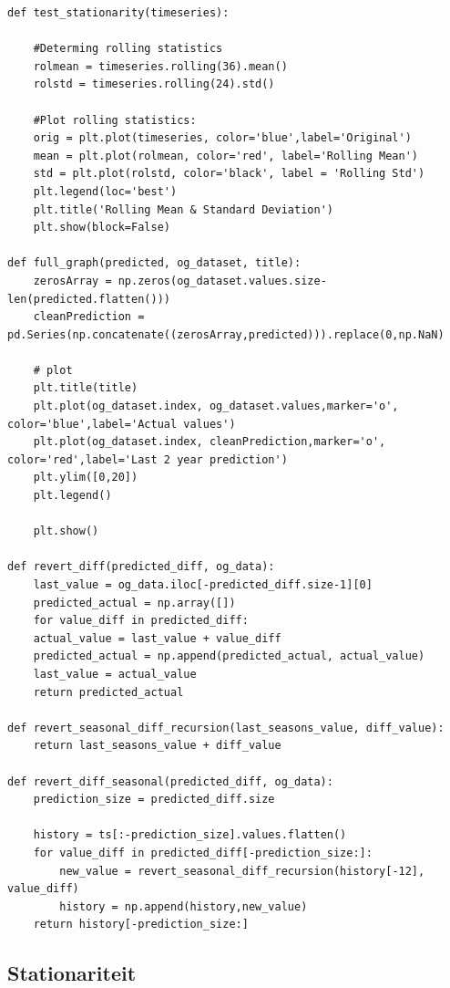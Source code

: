 \begin{verbatim}
def test_stationarity(timeseries):

    #Determing rolling statistics
    rolmean = timeseries.rolling(36).mean()
    rolstd = timeseries.rolling(24).std()
    
    #Plot rolling statistics:
    orig = plt.plot(timeseries, color='blue',label='Original')
    mean = plt.plot(rolmean, color='red', label='Rolling Mean')
    std = plt.plot(rolstd, color='black', label = 'Rolling Std')
    plt.legend(loc='best')
    plt.title('Rolling Mean & Standard Deviation')
    plt.show(block=False)

def full_graph(predicted, og_dataset, title):
    zerosArray = np.zeros(og_dataset.values.size-len(predicted.flatten()))
    cleanPrediction = pd.Series(np.concatenate((zerosArray,predicted))).replace(0,np.NaN)
    
    # plot
    plt.title(title)
    plt.plot(og_dataset.index, og_dataset.values,marker='o', color='blue',label='Actual values')
    plt.plot(og_dataset.index, cleanPrediction,marker='o', color='red',label='Last 2 year prediction')
    plt.ylim([0,20])
    plt.legend()
    
    plt.show()

def revert_diff(predicted_diff, og_data):
    last_value = og_data.iloc[-predicted_diff.size-1][0]
    predicted_actual = np.array([])
    for value_diff in predicted_diff:
    actual_value = last_value + value_diff
    predicted_actual = np.append(predicted_actual, actual_value)
    last_value = actual_value
    return predicted_actual

def revert_seasonal_diff_recursion(last_seasons_value, diff_value):
    return last_seasons_value + diff_value

def revert_diff_seasonal(predicted_diff, og_data):
    prediction_size = predicted_diff.size

    history = ts[:-prediction_size].values.flatten()
    for value_diff in predicted_diff[-prediction_size:]:
        new_value = revert_seasonal_diff_recursion(history[-12], value_diff)
        history = np.append(history,new_value)
    return history[-prediction_size:]
\end{verbatim}

\subsection{Stationariteit}

